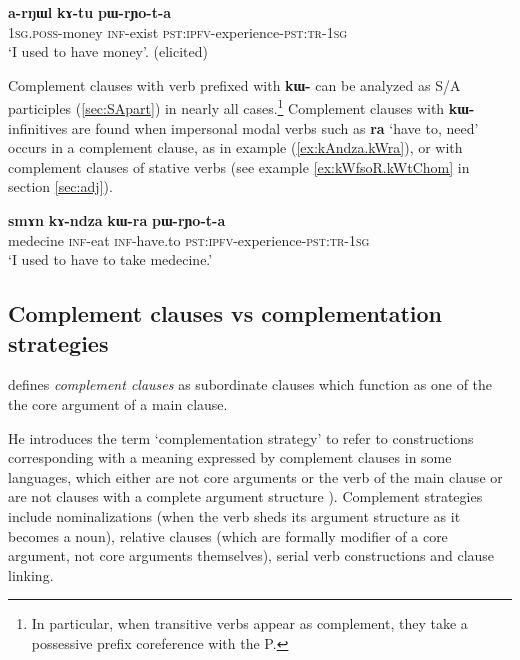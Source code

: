 \documentclass[oldfontcommands,oneside,a4paper,11pt]{article}
\newcommand{\ipa}[1]{\textbf{\phon#1}} %
\newcommand{\jpg}[2]{\ipa{#1} `#2'} %
\begin{document}
\begin{exe}
\ex \label{ex:rYo}
\gll \ipa{a-rŋɯl} 	\ipa{kɤ-tu} 	\ipa{pɯ-rɲo-t-a} \\
\textsc{1sg.poss}-money \textsc{inf}-exist \textsc{pst:ipfv}-experience-\textsc{pst:tr-1sg} \\
\glt `I used to have money'. (elicited)
\end{exe}

Complement clauses with verb prefixed with \ipa{kɯ-} can be analyzed as S/A participles (\ref{sec:SApart}) in nearly all cases.\footnote{In particular, when transitive verbs appear as complement, they take a possessive prefix coreference with the P.}  Complement clauses with \ipa{kɯ-} infinitives are found when  impersonal modal verbs such as \jpg{ra}{have to, need} occurs in a complement clause, as in example (\ref{ex:kAndza.kWra}), or with complement clauses of stative verbs (see example \ref{ex:kWfsoR.kWtChom} in section \ref{sec:adj}).

\begin{exe}
\ex \label{ex:kAndza.kWra}
\gll 
\ipa{smɤn} 	\ipa{kɤ-ndza} 	\ipa{kɯ-ra} 	\ipa{pɯ-rɲo-t-a} \\ 
medecine \textsc{inf}-eat \textsc{inf}-have.to  \textsc{pst:ipfv}-experience-\textsc{pst:tr-1sg} \\
\glt  `I used to have to take medecine.' 
\end{exe}

\subsection{Complement clauses vs complementation strategies} \label{sec:strategies}

\citet[15]{dixon06complementation} defines \textit{complement clauses} as subordinate clauses which function as one of the the core argument of a main clause. 

He introduces the term `complementation strategy' to refer to constructions corresponding with a meaning expressed by complement clauses in some languages, which either are not core arguments or the verb of the main clause or are not clauses with a complete argument structure \citealt[34-40]{dixon06complementation}). Complement strategies include nominalizations (when the verb sheds its argument structure as it becomes a noun), relative clauses (which are formally modifier of a core argument, not core arguments themselves), serial verb constructions and clause linking.
\end{document}
